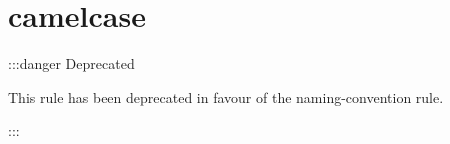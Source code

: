 \chapter{camelcase}
\hypertarget{md_pkiclassroomrescheduler_2src_2main_2frontend_2node__modules_2_0dtypescript-eslint_2eslint-plugin_2docs_2rules_2camelcase}{}\label{md_pkiclassroomrescheduler_2src_2main_2frontend_2node__modules_2_0dtypescript-eslint_2eslint-plugin_2docs_2rules_2camelcase}
\+::\+:danger Deprecated

This rule has been deprecated in favour of the {\ttfamily naming-\/convention} rule.

\+::\+: 